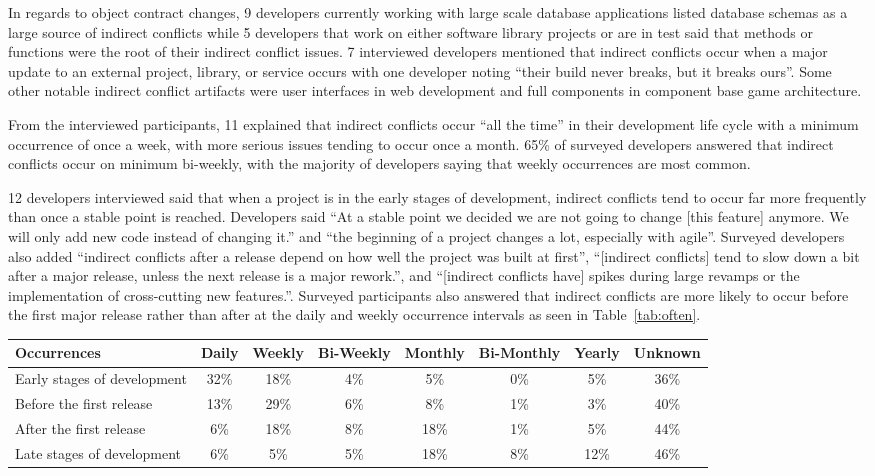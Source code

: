 In regards to object contract changes, 9 developers currently working with large scale database applications listed database
schemas as a large source of indirect conflicts while 5 developers that work on either software
library projects or are in test said that methods or functions were the root of their indirect conflict issues. 
7 interviewed developers mentioned that indirect conflicts occur when a major update to an external project, 
library, or service occurs with one developer noting ``their build never breaks, but it breaks ours''. Some
other notable indirect conflict artifacts were user interfaces in web development and full components in component 
base game architecture. 

From the interviewed participants, 11 explained that indirect conflicts occur ``all the time'' in
their development life cycle with a minimum occurrence of once a week, with more serious issues tending
to occur once a month. 65\% of surveyed developers answered that indirect conflicts occur on minimum bi-weekly,
with the majority of developers saying that weekly occurrences are most common.  

12 developers interviewed said that
when a project is in the early stages of development, indirect conflicts tend to occur far more frequently
than once a stable point is reached. Developers said ``At a stable point we decided we are not going to change
[this feature] anymore. We will only add new code instead of changing it.'' and ``the beginning of a project 
changes a lot, especially with agile''. Surveyed developers also added ``indirect conflicts after a release 
depend on how well the project was built at first'', ``[indirect conflicts] tend to slow down a bit after a 
major release, unless the next release is a major rework.'', and ``[indirect conflicts have] spikes during 
large revamps or the implementation of cross-cutting new features.''. Surveyed participants also answered that 
indirect conflicts are more likely to occur before the first major release rather than after at the daily
and weekly occurrence intervals as seen in Table~\ref{tab:often}.

\begin{table*}[ht]
\begin{center}
\begin{tabular}{| p{1.6cm} | c | c | c | c | c | c | c |}
\hline
Occurrences & Daily & Weekly & Bi-Weekly & Monthly & Bi-Monthly & Yearly & Unknown \\
\hline
\hline
Early stages of development & 32\% & 18\% & 4\% & 5\% & 0\% & 5\% & 36\% \\ \hline
Before the first release & 13\% & 29\% & 6\% & 8\% & 1\% & 3\% & 40\% \\ \hline
After the first release & 6\% & 18\% & 8\% & 18\% & 1\% & 5\% & 44\% \\ \hline
Late stages of development & 6\% & 5\% & 5\% & 18\% & 8\% & 12\% & 46\% \\ \hline
\end{tabular}
\end{center}
\caption{Results of survey questions to how often indirect conflicts occur, in terms of percentage
of developers surveyed.\label{tab:often}}
\end{table*}


